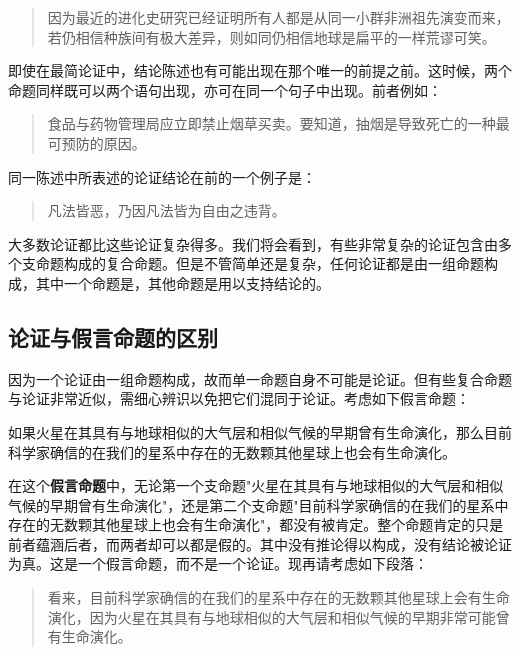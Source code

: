 \begin{quotation}
因为最近的进化史研究已经证明所有人都是从同一小群非洲祖先演变而来，若仍相信种族间有极大差异，则如同仍相信地球是扁平的一样荒谬可笑。\cite{hayden2000}
\end{quotation}

即使在最简论证中，结论陈述也有可能出现在那个唯一的前提之前。这时候，两个命题同样既可以两个语句出现，亦可在同一个句子中出现。前者例如：

\begin{quotation}
食品与药物管理局应立即禁止烟草买卖。要知道，抽烟是导致死亡的一种最可预防的原因。\cite{ban1992}
\end{quotation}

同一陈述中所表述的论证结论在前的一个例子是：

\begin{quotation}
凡法皆恶，乃因凡法皆为自由之违背。\cite{bentham1802}
\end{quotation}

大多数论证都比这些论证复杂得多。我们将会看到，有些非常复杂的论证包含由多个支命题构成的复合命题。但是不管简单还是复杂，任何论证都是由一组命题构成，其中一个命题是，其他命题是用以支持结论的。

\subsection{论证与假言命题的区别}

因为一个论证由一组命题构成，故而单一命题自身不可能是论证。但有些复合命题与论证非常近似，需细心辨识以免把它们混同于论证。考虑如下假言命题：

\begin{displayquote}
如果火星在其具有与地球相似的大气层和相似气候的早期曾有生命演化，那么目前科学家确信的在我们的星系中存在的无数颗其他星球上也会有生命演化。
\end{displayquote}

在这个\textbf{假言命题}中，无论第一个支命题"火星在其具有与地球相似的大气层和相似气候的早期曾有生命演化"，还是第二个支命题"目前科学家确信的在我们的星系中存在的无数颗其他星球上也会有生命演化"，都没有被肯定。整个命题肯定的只是前者蕴涵后者，而两者却可以都是假的。其中没有推论得以构成，没有结论被论证为真。这是一个假言命题，而不是一个论证。现再请考虑如下段落：

\begin{quotation}
看来，目前科学家确信的在我们的星系中存在的无数颗其他星球上会有生命演化，因为火星在其具有与地球相似的大气层和相似气候的早期非常可能曾有生命演化。\cite{zare1996}
\end{quotation}


